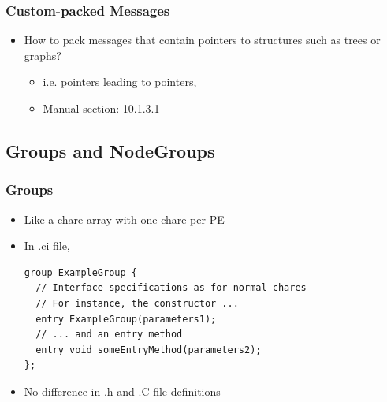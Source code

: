 \begin{frame}[fragile]
  \frametitle{Custom-packed Messages}
  \begin{itemize}
    \item How to pack messages that contain pointers to structures such as trees or graphs?
    \begin{itemize}
       \item i.e. pointers leading to pointers,
       \item Manual section: 10.1.3.1
    \end{itemize}
  \end{itemize}
\end{frame}

\subsection[Groups]{Groups and NodeGroups}
\begin{frame}[fragile]
  \frametitle{Groups}
  \begin{itemize}
    \item Like a chare-array with one chare per PE
    \item In .ci file, 
    \begin{lstlisting}
group ExampleGroup {
  // Interface specifications as for normal chares
  // For instance, the constructor ...
  entry ExampleGroup(parameters1);
  // ... and an entry method
  entry void someEntryMethod(parameters2);
};
    \end{lstlisting}
    \item No difference in .h and .C file definitions
  \end{itemize}
\end{frame}

